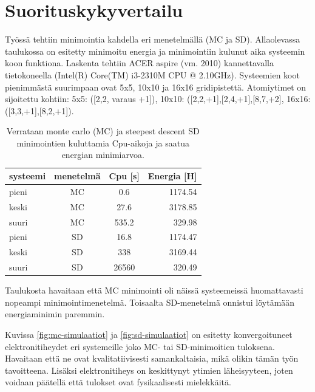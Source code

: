 \documentclass{article}
\begin{document}
\section{Suorituskykyvertailu}
Työssä tehtiin minimointia kahdella eri menetelmällä (MC ja
SD). Allaolevassa taulukossa on esitetty minimoitu energia ja
minimointiin kulunut aika systeemin koon funktiona.  Laskenta tehtiin
ACER aspire (vm. 2010) kannettavalla tietokoneella (Intel(R) Core(TM)
i3-2310M CPU @ 2.10GHz). Systeemien koot pienimmästä suurimpaan ovat
5x5, 10x10 ja 16x16 gridipistettä. Atomiytimet on sijoitettu kohtiin:
5x5: ([2,2, varaus +1]), 10x10: ([2,2,+1],[2,4,+1],[8,7,+2], 16x16:
([3,3,+1],[8,2,+1]).
\begin{center}
\begin{table}
  \begin{tabular}{ | l | c | c | r |}
    \hline
    systeemi & menetelmä & Cpu [s] & Energia [H] \\
    \hline
    \hline
    pieni & MC & 0.6 & 1174.54 \\ \hline
    keski & MC & 27.6 & 3178.85 \\ \hline
    suuri & MC & 535.2 & 329.98 \\ \hline
    pieni & SD & 16.8 & 1174.47 \\ \hline
    keski & SD & 338 & 3169.44 \\ \hline
    suuri & SD & 26560 & 320.49 \\ \hline
    \hline
  \end{tabular}
\caption[]{Verrataan monte carlo (MC) ja steepest descent SD
  minimointien kuluttamia Cpu-aikoja ja saatua energian minimiarvoa.}
\label{table:tulos1}
\end{table}
\end{center}
Taulukosta havaitaan että MC minimointi oli näissä systeemeissä
huomattavasti nopeampi minimointimenetelmä. Toisaalta SD-menetelmä
onnistui löytämään energiaminimin paremmin.

Kuvissa \ref{fig:mc-simulaatiot} ja \ref{fig:sd-simulaatiot} on
esitetty konvergoituneet elektronitiheydet eri systemeille joko MC-
tai SD-minimoitien tuloksena. Havaitaan että ne ovat kvalitatiivisesti
samankaltaisia, mikä olikin tämän työn tavoitteena. Lisäksi
elektronitiheys on keskittynyt ytimien läheisyyteen, joten voidaan
päätellä että tulokset ovat fysikaalisesti mielekkäitä.
\end{document}
